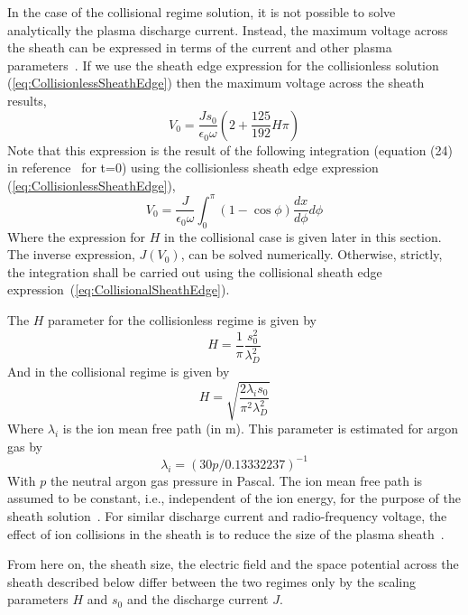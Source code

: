 In the case of the collisional regime solution, it is not possible to solve analytically the plasma discharge current. Instead, the maximum voltage across the sheath can be expressed in terms of the current and other plasma parameters~\cite{Lieberman1989}. If we use the sheath edge expression for the collisionless solution (\ref{eq:CollisionlessSheathEdge}) then the maximum voltage across the sheath results, 
\begin{equation}
V_0 = \frac{J s_0}{\epsilon_0 \omega} \left(  2 + \frac{125}{192} H \pi \right)
\end{equation}
Note that this expression is the result of the following integration (equation (24) in reference~\cite{Lieberman1989} for t=0) using the collisionless sheath edge expression (\ref{eq:CollisionlessSheathEdge}),
\begin{equation}
V_0 = \frac{J}{\epsilon_0 \omega} \int_0^{\pi} (1- \cos \phi) \frac{d x}{d \phi} d \phi 
\end{equation}
Where the expression for $H$ in the collisional case is given later in this section. The inverse expression, $J(V_0)$, can be solved numerically. Otherwise, strictly, the integration shall be carried out using the collisional sheath edge expression~(\ref{eq:CollisionalSheathEdge}). 
 
The $H$ parameter for the collisionless regime is given by~\cite{Lieberman1988}
\begin{equation}
H = \frac1{\pi} \frac{s_0^2}{\lambda_D^2}
\end{equation}
And in the collisional regime is given by~\cite{Lieberman1989}
\begin{equation}
H = \sqrt{  \frac{2 \lambda_i s_0}{\pi^2 \lambda_D^2}  }
\end{equation}
Where $\lambda_i$ is the ion mean free path (in m). This parameter is estimated for argon gas by~\cite{Lieberman1989}
\begin{equation}\label{eq:lambda_i}
\lambda_i = (30 p /0.13332237)^{-1}
\end{equation}
With $p$ the neutral argon gas pressure in Pascal. The ion mean free path is assumed to be constant, i.e., independent of the ion energy, for the purpose of the sheath solution~\cite{Lieberman1989}. For similar discharge current and radio-frequency voltage, the effect of ion collisions in the sheath is to reduce the size of the plasma sheath~\cite{Lieberman1989}.

From here on, the sheath size, the electric field and the space potential across the sheath described below differ between the two regimes only by the scaling parameters $H$ and $s_0$ and the discharge current $J$.

